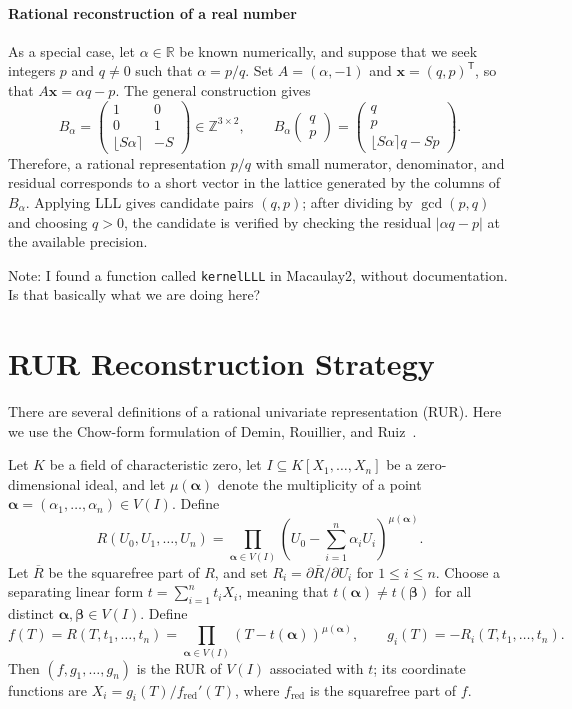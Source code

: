 \documentclass{weeklyprogress}
\begin{document}
\paragraph{Rational reconstruction of a real number} As a special case, let $\alpha\in\mathbb{R}$ be known numerically, and suppose that we seek integers $p$ and $q\neq0$ such that $\alpha=p/q$. Set $A=(\alpha,-1)$ and $\bm{x}=(q,p)^{\mathsf{T}}$, so that $A\bm{x}=\alpha q-p$. The general construction gives
\[ B_\alpha=\begin{pmatrix} 1&0\\0&1\\\lfloor S\alpha\rceil&-S \end{pmatrix}\in\mathbb{Z}^{3\times2},\qquad B_\alpha\begin{pmatrix}q\\p\end{pmatrix}=\begin{pmatrix}q\\p\\\lfloor S\alpha\rceil q-Sp\end{pmatrix}. \]
Therefore, a rational representation $p/q$ with small numerator, denominator, and residual corresponds to a short vector in the lattice generated by the columns of $B_\alpha$. Applying LLL gives candidate pairs $(q,p)$; after dividing by $\gcd(p,q)$ and choosing $q>0$, the candidate is verified by checking the residual $|\alpha q-p|$ at the available precision.

Note: I found a function called \verb|kernelLLL| in Macaulay2, without documentation. Is that basically what we are doing here?

\clearpage

\section{RUR Reconstruction Strategy}

There are several definitions of a rational univariate representation (RUR). Here we use the Chow-form formulation of Demin, Rouillier, and Ruiz~\cite{demin-rouillier-ruiz-rur}.

\begin{definition}
Let $K$ be a field of characteristic zero, let $I\subseteq K[X_1,\ldots,X_n]$ be a zero-dimensional ideal, and let $\mu(\bm{\alpha})$ denote the multiplicity of a point $\bm{\alpha}=(\alpha_1,\ldots,\alpha_n)\in V(I)$. Define
\[ R(U_0,U_1,\ldots,U_n)=\prod_{\bm{\alpha}\in V(I)}\left(U_0-\sum_{i=1}^n\alpha_iU_i\right)^{\mu(\bm{\alpha})}. \]
Let $\overline{R}$ be the squarefree part of $R$, and set $R_i=\partial\overline{R}/\partial U_i$ for $1\leq i\leq n$. Choose a separating linear form $t=\sum_{i=1}^nt_iX_i$, meaning that $t(\bm{\alpha})\neq t(\bm{\beta})$ for all distinct $\bm{\alpha},\bm{\beta}\in V(I)$. Define
\[ f(T)=R(T,t_1,\ldots,t_n)=\prod_{\bm{\alpha}\in V(I)}(T-t(\bm{\alpha}))^{\mu(\bm{\alpha})},\qquad g_i(T)=-R_i(T,t_1,\ldots,t_n). \]
Then $(f,g_1,\ldots,g_n)$ is the RUR of $V(I)$ associated with $t$; its coordinate functions are $X_i=g_i(T)/f_{\mathrm{red}}'(T)$, where $f_{\mathrm{red}}$ is the squarefree part of $f$.
\end{definition}
\end{document}
